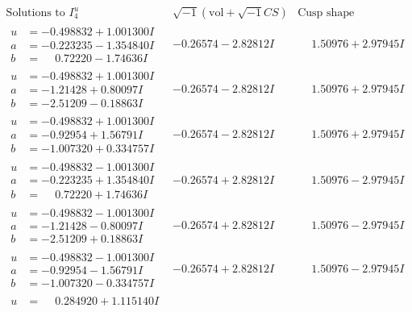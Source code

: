 \documentclass[1p]{elsarticle_modified}
\theoremstyle{definition}
\newcommand{\I}{\sqrt{-1}}
\begin{document}
$$\begin{array}{c|c|c}  
\text{Solutions to }I^u_{4}& \I (\text{vol} + \sqrt{-1}CS) & \text{Cusp shape}\\
 \hline 
\begin{aligned}
u &= -0.498832 + 1.001300 I \\
a &= -0.223235 - 1.354840 I \\
b &= \phantom{-}0.72220 - 1.74636 I\end{aligned}
 & -0.26574 - 2.82812 I & \phantom{-}1.50976 + 2.97945 I \\ \hline\begin{aligned}
u &= -0.498832 + 1.001300 I \\
a &= -1.21428 + 0.80097 I \\
b &= -2.51209 - 0.18863 I\end{aligned}
 & -0.26574 - 2.82812 I & \phantom{-}1.50976 + 2.97945 I \\ \hline\begin{aligned}
u &= -0.498832 + 1.001300 I \\
a &= -0.92954 + 1.56791 I \\
b &= -1.007320 + 0.334757 I\end{aligned}
 & -0.26574 - 2.82812 I & \phantom{-}1.50976 + 2.97945 I \\ \hline\begin{aligned}
u &= -0.498832 - 1.001300 I \\
a &= -0.223235 + 1.354840 I \\
b &= \phantom{-}0.72220 + 1.74636 I\end{aligned}
 & -0.26574 + 2.82812 I & \phantom{-}1.50976 - 2.97945 I \\ \hline\begin{aligned}
u &= -0.498832 - 1.001300 I \\
a &= -1.21428 - 0.80097 I \\
b &= -2.51209 + 0.18863 I\end{aligned}
 & -0.26574 + 2.82812 I & \phantom{-}1.50976 - 2.97945 I \\ \hline\begin{aligned}
u &= -0.498832 - 1.001300 I \\
a &= -0.92954 - 1.56791 I \\
b &= -1.007320 - 0.334757 I\end{aligned}
 & -0.26574 + 2.82812 I & \phantom{-}1.50976 - 2.97945 I \\ \hline\begin{aligned}
u &= \phantom{-}0.284920 + 1.115140 I \\

\end{aligned}
\end{array}$$
\end{document}
